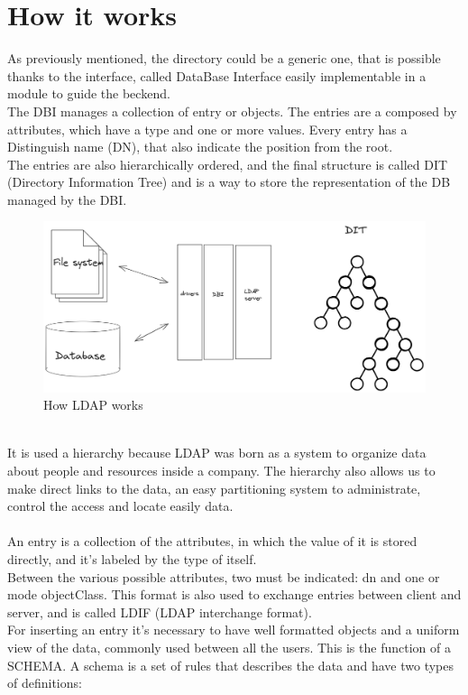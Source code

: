 \section{How it works}
As previously mentioned, the directory could be a generic one, that is possible thanks to the interface, called DataBase Interface easily implementable in a module to guide the beckend. 
\\
The DBI manages a collection of entry or objects. The entries are a composed by attributes, which have a type and one or more values. Every entry has a Distinguish name (DN), that also indicate the position from the root.
\\
The entries are also hierarchically ordered, and the final structure is called DIT (Directory Information Tree) and is a way to store the representation of the DB managed by the DBI.
\begin{figure}[h]
    \caption{How LDAP works}
    \centering
    \includegraphics[width=\textwidth]{img/arch.png}
\end{figure}
\\
It is used a hierarchy because LDAP was born as a system to organize data about people and resources inside a company. The hierarchy also allows us to make direct links to the data, an easy partitioning system to administrate, control the access and locate easily data. 
\\\\
An entry is a collection of the attributes, in which the value of it is stored directly, and it’s labeled by the type of itself.
\\
Between the various possible attributes, two must be indicated: dn and one or mode objectClass. This format is also used to exchange entries between client and server, and is called LDIF (LDAP interchange format). 
\\
For inserting an entry it’s necessary to have well formatted objects and a uniform view of the data, commonly used between all the users. This is the function of a SCHEMA. A schema is a set of rules that describes the data and have two types of definitions: 
